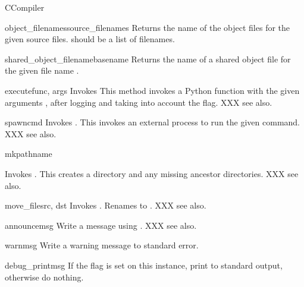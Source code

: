 \documentclass{manual}
\begin{document}
\begin{classdesc}{CCompiler}{}
\begin{methoddesc}{object_filenames}{source_filenames}
Returns the name of the object files for the given source files. 
 should be a list of filenames. 
\end{methoddesc}

\begin{methoddesc}{shared_object_filename}{basename}
Returns the name of a shared object file for the given file name .
\end{methoddesc}

\begin{methoddesc}{execute}{func, args}
Invokes  This method invokes a 
Python function  with the given arguments , after 
logging and taking into account the  flag. XXX see also.
\end{methoddesc}

\begin{methoddesc}{spawn}{cmd}
Invokes . This invokes an external 
process to run the given command. XXX see also.
\end{methoddesc}

\begin{methoddesc}{mkpath}{name}

Invokes . This creates a directory 
and any missing ancestor directories. XXX see also.
\end{methoddesc}

\begin{methoddesc}{move_file}{src, dst}
Invokes . Renames  to 
.  XXX see also.
\end{methoddesc}

\begin{methoddesc}{announce}{msg}
Write a message using . XXX see also.
\end{methoddesc}

\begin{methoddesc}{warn}{msg}
Write a warning message  to standard error.
\end{methoddesc}

\begin{methoddesc}{debug_print}{msg}
If the  flag is set on this  instance, print 
 to standard output, otherwise do nothing.
\end{methoddesc}

\end{classdesc}
\end{document}
